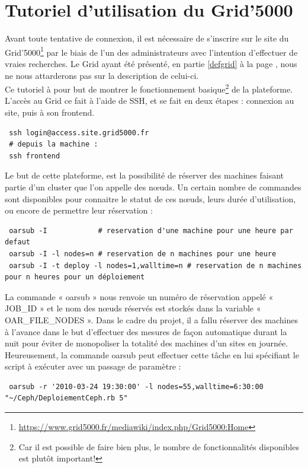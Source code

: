 \documentclass[12pt]{report}
\begin{document}
		  \section{Tutoriel d'utilisation du Grid'5000}
		  \label{grid}
		  Avant toute tentative de connexion, il est nécessaire de s'inscrire sur le site du Grid'5000\footnote{\href{https://www.grid5000.fr/mediawiki/index.php/Grid5000:Home}{https://www.grid5000.fr/mediawiki/index.php/Grid5000:Home}} par le biais de l'un des administrateurs avec l'intention d'effectuer de vraies recherches. Le Grid ayant été présenté, en partie \ref{defgrid} à la page \pageref{defgrid}, nous ne nous attarderons pas sur la description de celui-ci.\\
		  Ce tutoriel à pour but de montrer le fonctionnement basique\footnote{Car il est possible de faire bien plus, le nombre de fonctionnalités disponibles est plutôt important!} de la plateforme.\\
		  L'accès au Grid ce fait à l'aide de SSH, et se fait en deux étapes : connexion au site, puis à son frontend.
		  \begin{lstlisting}
 ssh login@access.site.grid5000.fr
 # depuis la machine :
 ssh frontend
      \end{lstlisting}
      Le but de cette plateforme, est la possibilité de réserver des machines faisant partie d'un cluster que l'on appelle des nœuds. Un certain nombre de commandes sont disponibles pour connaitre le statut de ces nœuds, leurs durée d'utilisation, ou encore de permettre leur réservation :
		  \begin{lstlisting}
 oarsub -I            # reservation d'une machine pour une heure par defaut
 oarsub -I -l nodes=n # reservation de n machines pour une heure
 oarsub -I -t deploy -l nodes=1,walltime=n # reservation de n machines pour n heures pour un déploiement
      \end{lstlisting}
      La commande « oarsub » nous renvoie un numéro de réservation appelé « JOB\_ID » et le nom des nœuds réservés est stockés dans la variable « OAR\_FILE\_NODES ».
      Dans le cadre du projet, il a fallu réserver des machines à l'avance dans le but d'effectuer des mesures de façon automatique durant la nuit pour éviter de monopoliser la totalité des machines d'un sites en journée. Heureusement, la commande oarsub peut effectuer cette tâche en lui spécifiant le script à exécuter avec un passage de paramètre :
      \begin{lstlisting}
 oarsub -r '2010-03-24 19:30:00' -l nodes=55,walltime=6:30:00 "~/Ceph/DeploiementCeph.rb 5"
      \end{lstlisting}
\end{document}
